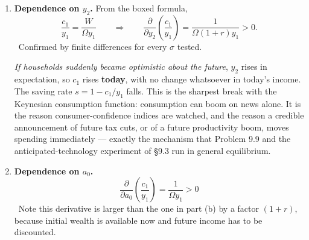 \documentclass[12pt, letterpaper]{article}
\newcommand{\pd}[2]{\dfrac{\partial #1}{\partial #2}}
\begin{document}
\begin{tcolorbox}[oddbox,title={Problem 6.1 \quad Two-Period Problem with Taxes and Initial Wealth}]
\begin{enumerate}
\smallskip
\textbf{Step 3: substitute back.} Putting (6.1.2) into (6.1.1),
\[
c_1\left[1+\frac{\left[\beta(1+r)\right]^{1/\sigma}}{1+r}\right]=W
\qquad\Longrightarrow\qquad
c_1=\frac{W}{\Omega},
\qquad
\Omega\equiv1+\beta^{\frac{1}{\sigma}}(1+r)^{\frac{1-\sigma}{\sigma}} .
\]
Therefore
\[
\boxed{\;c_1=\frac{a_0+y_1-\tau_1+\dfrac{y_2-\tau_2}{1+r}}{\Omega}\;}
\qquad
\boxed{\;c_2=\left[\beta(1+r)\right]^{\frac{1}{\sigma}}\frac{W}{\Omega}\;}
\]
\[
\boxed{\;a=a_0+y_1-\tau_1-\frac{W}{\Omega}\;}
\]
\checkmark\ In \texttt{ch06\_numerico.py} this closed form is compared, for
$\sigma\in\{0.5,1,2,4\}$, against a direct numerical maximisation of
$u(c_1)+\beta u(c_2)$ over the budget line; the two agree to $10^{-6}$, and the Euler
equation and the budget constraint are each substituted back and verified.

\smallskip
\emph{Read the formula before doing any comparative statics.} It has exactly two moving
parts. The numerator $W$ is \textbf{lifetime resources}: it is where $y_1$, $y_2$, $a_0$ and
the two taxes live, and \emph{only their present value matters} --- the timing of income and
of taxes is irrelevant to it. The denominator $\Omega$ is \textbf{the shape of the plan}: it
is where $\beta$, $\sigma$ and $r$ live, and it determines how the given resources are split
between the two dates. Every part below is a question about one or the other.

\item \textbf{Dependence on $y_2$.} From the boxed formula,
\[
\frac{c_1}{y_1}=\frac{W}{\Omega y_1}
\qquad\Longrightarrow\qquad
\boxed{\pd{}{y_2}\left(\frac{c_1}{y_1}\right)=\frac{1}{\Omega(1+r)y_1}>0} .
\]
\checkmark\ Confirmed by finite differences for every $\sigma$ tested.

\smallskip
\emph{If households suddenly became optimistic about the future}, $y_2$ rises in
expectation, so $c_1$ rises \textbf{today}, with no change whatsoever in today's income. The
saving rate $s=1-c_1/y_1$ falls. This is the sharpest break with the Keynesian consumption
function: consumption can boom on news alone. It is the reason consumer-confidence indices
are watched, and the reason a credible announcement of future tax cuts, or of a future
productivity boom, moves spending immediately --- exactly the mechanism that Problem 9.9 and
the anticipated-technology experiment of \S9.3 run in general equilibrium.

\item \textbf{Dependence on $a_0$.}
\[
\boxed{\pd{}{a_0}\left(\frac{c_1}{y_1}\right)=\frac{1}{\Omega y_1}>0}
\]
\checkmark\ Note this derivative is larger than the one in part (b) by a factor $(1+r)$,
because initial wealth is available now and future income has to be discounted.


\end{enumerate}
\end{tcolorbox}
\end{document}
